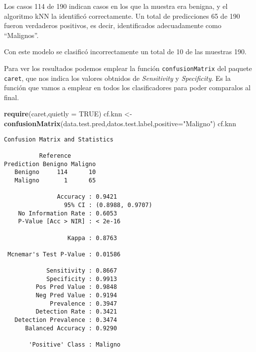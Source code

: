 \documentclass[
]{article}
\newenvironment{Shaded}{\begin{snugshade}}{\end{snugshade}}
\newcommand{\DataTypeTok}[1]{\textcolor[rgb]{0.13,0.29,0.53}{#1}}
\newcommand{\KeywordTok}[1]{\textcolor[rgb]{0.13,0.29,0.53}{\textbf{#1}}}
\newcommand{\NormalTok}[1]{#1}
\newcommand{\OtherTok}[1]{\textcolor[rgb]{0.56,0.35,0.01}{#1}}
\newcommand{\StringTok}[1]{\textcolor[rgb]{0.31,0.60,0.02}{#1}}
\begin{document}
Los casos 114 de 190 indican casos en los que la muestra era benigna, y
el algoritmo kNN la identificó correctamente. Un total de predicciones
65 de 190 fueron verdaderos positivos, es decir, identificados
adecuadamente como ``Malignos''.

Con este modelo se clasificó incorrectamente un total de 10 de las
muestras 190.

Para ver los resultados podemos emplear la función
\texttt{confusionMatrix} del paquete \texttt{caret}, que nos indica los
valores obtnidos de \emph{Sensitivity} y \emph{Specificity}. Es la
función que vamos a emplear en todos los clasificadores para poder
comparalos al final.

\begin{Shaded}
\begin{Highlighting}[]
\KeywordTok{require}\NormalTok{(caret,}\DataTypeTok{quietly =} \OtherTok{TRUE}\NormalTok{)}
\NormalTok{cf.knn <-}\StringTok{ }\KeywordTok{confusionMatrix}\NormalTok{(data.test.pred,datos.test.label,}\DataTypeTok{positive=}\StringTok{"Maligno"}\NormalTok{)}
\NormalTok{cf.knn}
\end{Highlighting}
\end{Shaded}

\begin{verbatim}
Confusion Matrix and Statistics

          Reference
Prediction Benigno Maligno
   Benigno     114      10
   Maligno       1      65
                                          
               Accuracy : 0.9421          
                 95% CI : (0.8988, 0.9707)
    No Information Rate : 0.6053          
    P-Value [Acc > NIR] : < 2e-16         
                                          
                  Kappa : 0.8763          
                                          
 Mcnemar's Test P-Value : 0.01586         
                                          
            Sensitivity : 0.8667          
            Specificity : 0.9913          
         Pos Pred Value : 0.9848          
         Neg Pred Value : 0.9194          
             Prevalence : 0.3947          
         Detection Rate : 0.3421          
   Detection Prevalence : 0.3474          
      Balanced Accuracy : 0.9290          
                                          
       'Positive' Class : Maligno         
                                          
\end{verbatim}
\end{document}
